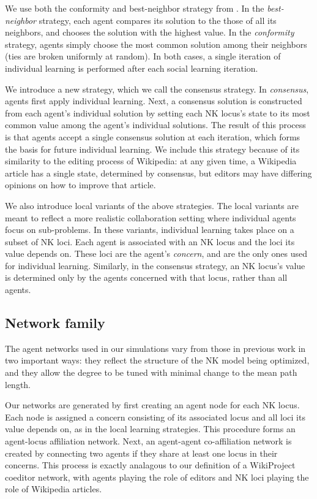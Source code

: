 \documentclass[10pt,twocolumn]{article}
\newcommand{\+}{\phantom{-}}
\begin{document}
We use both the conformity and best-neighbor strategy from \cite{barkoczi_social_2016}.
In the {\em best-neighbor} strategy, each agent compares its solution to the those of all its
neighbors, and chooses the solution with the highest value.
In the {\em conformity} strategy, agents simply choose the most common solution among their neighbors
(ties are broken uniformly at random).
In both cases, a single iteration of individual learning is performed after each social learning
iteration.

We introduce a new strategy, which we call the consensus strategy.
In {\em consensus}, agents first apply individual learning.
Next, a consensus solution is constructed from each agent's individual solution by setting
each NK locus's state to its most common value among the agent's individual solutions.
The result of this process is that agents accept a single consensus solution at each iteration,
which forms the basis for future individual learning.
We include this strategy because of its similarity to the editing process of Wikipedia:
at any given time, a Wikipedia article has a single state, determined by consensus,
but editors may have differing opinions on how to improve that article.

We also introduce local variants of the above strategies.
The local variants are meant to reflect a more realistic collaboration setting where
individual agents focus on sub-problems.
In these variants, individual learning takes place on a subset of NK loci.
Each agent is associated with an NK locus and the loci its value depends on.
These loci are the agent's {\em concern},
and are the only ones used for individual learning.
Similarly, in the consensus strategy, an NK locus's value is determined only by the agents
concerned with that locus, rather than all agents.

\subsection{Network family}

The agent networks used in our simulations vary from those in previous work in two important ways:
they reflect the structure of the NK model being optimized,
and they allow the degree to be tuned with minimal change to the mean path length.

Our networks are generated by first creating an agent node for each NK locus.
Each node is assigned a concern consisting of its associated locus and all loci its value depends on,
as in the local learning strategies.
This procedure forms an agent-locus affiliation network.
Next, an agent-agent co-affiliation network is created by connecting two agents if they share at least
one locus in their concerns.
This process is exactly analagous to our definition of a WikiProject coeditor network,
with agents playing the role of editors and NK loci playing the role of Wikipedia articles.
\end{document}
